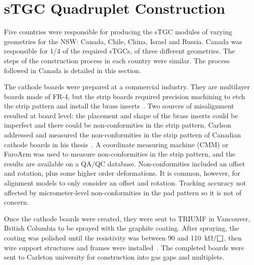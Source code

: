 \section{sTGC Quadruplet Construction}
\label{sec:stgc_construction}

Five countries were responsible for producing the sTGC modules of varying geometries for the NSW: Canada, Chile, China, Israel and Russia. Canada was responsible for 1/4 of the required sTGCs, of three different geometries. The steps of the construction process in each country were similar. The process followed in Canada is detailed in this section.

The cathode boards were prepared at a commercial industry. They are multilayer boards made of FR-4, but the strip boards required precision machining to etch the strip pattern and install the brass inserts~\cite{nsw_tdr}. Two sources of misalignment resulted at board level: the placement and shape of the brass inserts could be imperfect and there could be non-conformities in the strip pattern. Carlson addressed and measured the non-conformities in the strip pattern of Canadian cathode boards in his thesis~\cite{carlson_results_2019}. A coordinate measuring machine (CMM) or FaroArm was used to measure non-conformities in the strip pattern, and the results are available on a QA/QC database. Non-conformities included an offset and rotation, plus some higher order deformations. It is common, however, for alignment models to only consider an offset and rotation. Tracking accuracy not affected by micrometer-level non-conformities in the pad pattern so it is not of concern.

Once the cathode boards were created, they were sent to TRIUMF in Vancouver, British Columbia to be sprayed with the graphite coating. After spraying, the coating was polished until the resistivity was between 90 and \SI{110}{\kilo\ohm}$/\msquare$, then wire support structures and frames were installed~\cite{nsw_tdr}. The completed boards were sent to Carleton university for construction into gas gaps and multiplets.

